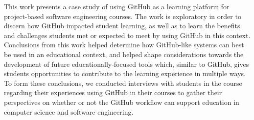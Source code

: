 

This work presents a case study of using GitHub as a learning platform for project-based software engineering courses. The work is exploratory in order to discern how GitHub impacted student learning, as well as to learn the benefits and challenges students met or expected to meet by using GitHub in this context. Conclusions from this work helped determine how GitHub-like systems can best be used in an educational context, and helped shape considerations towards the development of future educationally-focused tools which, similar to GitHub, gives students opportunities to contribute to the learning experience in multiple ways. To form these conclusions, we conducted interviews with students in the course regarding their experiences using GitHub in their courses to gather their perspectives on whether or not the GitHub workflow can support education in computer science and software engineering.

